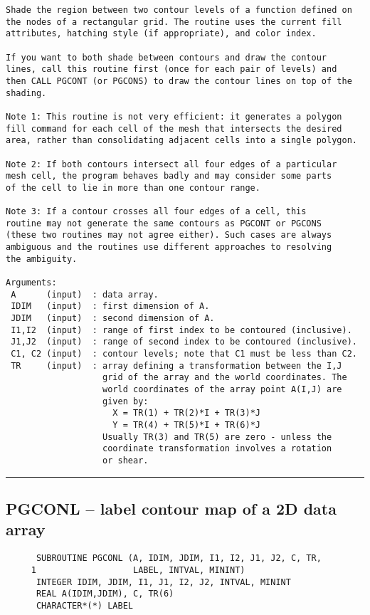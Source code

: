 {\begin{verbatim}
Shade the region between two contour levels of a function defined on
the nodes of a rectangular grid. The routine uses the current fill
attributes, hatching style (if appropriate), and color index.

If you want to both shade between contours and draw the contour
lines, call this routine first (once for each pair of levels) and 
then CALL PGCONT (or PGCONS) to draw the contour lines on top of the
shading.

Note 1: This routine is not very efficient: it generates a polygon
fill command for each cell of the mesh that intersects the desired
area, rather than consolidating adjacent cells into a single polygon.

Note 2: If both contours intersect all four edges of a particular
mesh cell, the program behaves badly and may consider some parts
of the cell to lie in more than one contour range.

Note 3: If a contour crosses all four edges of a cell, this
routine may not generate the same contours as PGCONT or PGCONS
(these two routines may not agree either). Such cases are always
ambiguous and the routines use different approaches to resolving
the ambiguity.

Arguments:
 A      (input)  : data array.
 IDIM   (input)  : first dimension of A.
 JDIM   (input)  : second dimension of A.
 I1,I2  (input)  : range of first index to be contoured (inclusive).
 J1,J2  (input)  : range of second index to be contoured (inclusive).
 C1, C2 (input)  : contour levels; note that C1 must be less than C2.
 TR     (input)  : array defining a transformation between the I,J
                   grid of the array and the world coordinates. The
                   world coordinates of the array point A(I,J) are
                   given by:
                     X = TR(1) + TR(2)*I + TR(3)*J
                     Y = TR(4) + TR(5)*I + TR(6)*J
                   Usually TR(3) and TR(5) are zero - unless the
                   coordinate transformation involves a rotation
                   or shear.
\end{verbatim}
\hrule


\subsection*{PGCONL -- label contour map of a 2D data array  }
\begin{verbatim}
      SUBROUTINE PGCONL (A, IDIM, JDIM, I1, I2, J1, J2, C, TR,
     1                   LABEL, INTVAL, MININT)
      INTEGER IDIM, JDIM, I1, J1, I2, J2, INTVAL, MININT
      REAL A(IDIM,JDIM), C, TR(6)
      CHARACTER*(*) LABEL


\end{verbatim}}
